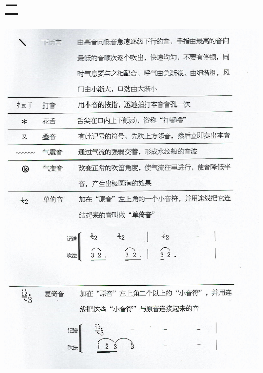\documentclass[cn,pad,chinese,chinesefont=nofont]{elegantbook}
\begin{document}
\section{二}
\includegraphics[width=\textwidth]{dongxiao/Scan 25.jpeg}
\end{document}
